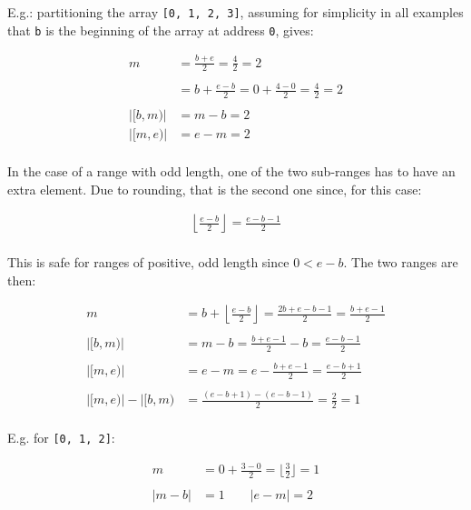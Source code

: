 E.g.: partitioning the array \texttt{[0, 1, 2, 3]}, assuming for simplicity in
all examples that \texttt{b} is the beginning of the array at address
\texttt{0}, gives:

\begin{align*}
           m &= \frac{b + e}{2}
              = \frac{4}{2}
              = 2 \\\\
             &= b + \frac{e - b}{2}
              = 0 + \frac{4 - 0}{2}
              = \frac{4}{2}
              = 2 \\\\
    |[b, m)| &= m - b = 2 \\
    |[m, e)| &= e - m = 2 \\
\end{align*}

In the case of a range with odd length, one of the two sub-ranges has to have an
extra element.  Due to rounding, that is the second one since, for this case:

\begin{align*}
    \left\lfloor \frac{e - b}{2} \right\rfloor = \frac{e - b - 1}{2} \\
\end{align*}

This is safe for ranges of positive, odd length since $0 < e - b$.  The two
ranges are then:

\begin{align*}
                     m &= b + \left\lfloor \frac{e - b}{2} \right\rfloor
                        = \frac{2b + e - b - 1}{2}
                        = \frac{b + e - 1}{2} \\\\
              |[b, m)| &= m - b
                        = \frac{b + e - 1}{2} - b
                        = \frac{e - b - 1}{2} \\\\
              |[m, e)| &= e - m
                        = e - \frac{b + e - 1}{2}
                        = \frac{e - b + 1}{2} \\\\
    |[m, e)| - |[b, m) &= \frac{(e - b + 1) - (e - b - 1)}{2}
                        = \frac{2}{2}
                        = 1 \\
\end{align*}

E.g. for \texttt{[0, 1, 2]}:

\begin{align*}
          m &= 0 + \frac{3 - 0}{2}
             = \bigg \lfloor \frac{3}{2} \bigg \rfloor
             = 1 \\\\
    |m - b| &= 1 \qquad |e - m|
             = 2 \\
\end{align*}

